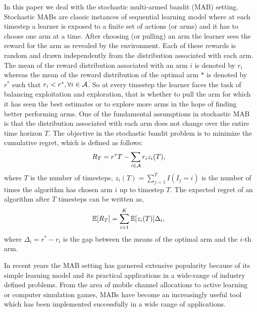 In this paper we deal with the stochastic multi-armed bandit (MAB) setting. Stochastic MABs are classic instances of sequential learning model where at each timestep a learner is exposed to a finite set of actions (or arms) and it has to choose one arm at a time. After choosing (or pulling) an arm the learner sees the reward for the arm as revealed by the environment. Each of these rewards is random and drawn independently from the distribution associated with each arm. The mean of the reward distribution associated with an arm $i$ is denoted by $r_i$ whereas the mean of the reward distribution of the optimal arm $*$ is denoted by $r^*$ such that $r_i < r^*, \forall i\in \mathcal{A}$. So at every timestep the learner faces the task of balancing exploitation and exploration, that is whether to pull the arm for which it has seen the best estimates or to explore more arms in the hope of finding better performing arms. One of the fundamental assumptions in stochastic MAB is that the distribution associated with each arm does not change over the entire time horizon $T$. The objective in the stochastic bandit problem is to minimize the cumulative regret, which is defined as follows:
\begin{align*}
R_{T}=r^{*}T - \sum_{i\in \mathcal{A}} r_{i}z_{i}(T),
\end{align*}
where $T$ is the number of timesteps, $z_{i}(T)=\sum_{j=1}^T I(I_j=i)$ is the number of times the algorithm has chosen arm $i$ up to timestep $T$.
The expected regret of an algorithm after $T$ timesteps can be written as,
\begin{align*}
\mathbb{E}[R_{T}]= \sum_{i=1}^K \mathbb{E}[z_i (T)] \Delta_i,
\end{align*}
where $\Delta_{i}=r^{*}-r_{i}$ is the gap between the means of the optimal arm and the $i$-th arm.

	In recent years the MAB setting has garnered extensive popularity because of its simple learning  model and its practical applications in a wide-range of industry defined problems. From the area of mobile channel allocations to active learning or computer simulation games, MABs have become an increasingly useful tool which has been implemented successfully in a wide range of applications. 